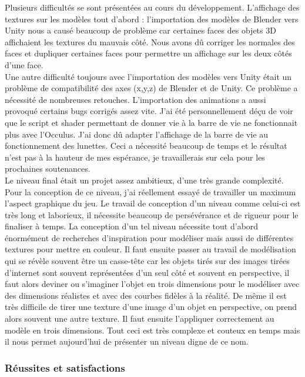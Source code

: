 \documentclass[12pt]{article}
\begin{document}
Plusieurs difficultés se sont présentées au cours du développement. L'affichage des textures sur les modèles tout d'abord : l’importation des modèles de Blender vers Unity nous a causé beaucoup de problème car certaines faces des objets 3D affichaient les textures du mauvais côté. Nous avons dû corriger les normales des faces et dupliquer certaines faces pour permettre un affichage sur les deux côtés d’une face.\\
Une autre difficulté toujours avec l’importation des modèles vers Unity était un problème de compatibilité des axes (x,y,z) de Blender et de Unity. Ce problème a nécessité de nombreuses retouches. L'importation des animations a aussi provoqué certains bugs corrigés assez vite.
J'ai été personnellement déçu de voir que le script et shader permettant de donner vie à la barre de vie ne fonctionnait plus avec l’Occulus. J'ai donc dû adapter l'affichage de la barre de vie au fonctionnement des lunettes. Ceci a nécessité beaucoup de temps et le résultat n'est pas à la hauteur de mes espérance, je travaillerais sur cela pour les prochaines soutenances.\\
Le niveau final était un projet assez ambitieux, d'une très grande complexité. Pour la conception de ce niveau, j'ai réellement essayé de travailler un maximum l'aspect graphique du jeu. Le travail de conception d’un niveau comme celui-ci est très long et laborieux, il nécessite beaucoup de persévérance et de rigueur pour le finaliser à temps. La conception d’un tel niveau nécessite tout d’abord énormément de recherches d'inspiration pour modéliser mais aussi de différentes textures pour mettre en couleur. Il faut ensuite passer au travail de modélisation qui se révèle souvent être un casse-tête car les objets tirés sur des images tirées d'internet sont souvent représentées d’un seul côté et souvent en perspective, il faut alors deviner ou s'imaginer l'objet en trois dimensions pour le modéliser avec des dimensions réalistes et avec des courbes fidèles à la réalité. De même il est très difficile de tirer une texture d’une image d’un objet en perspective, on prend alors souvent une autre texture. Il faut ensuite l'appliquer correctement au modèle en trois dimensions. Tout ceci est très complexe et couteux en temps mais il nous permet aujourd'hui de présenter un niveau digne de ce nom.

\subsubsection{Réussites et satisfactions}
\end{document}
